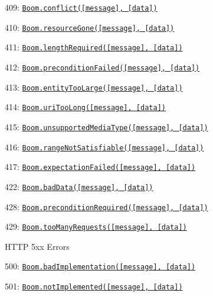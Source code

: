 \begin{DoxyItemize}
\begin{DoxyItemize}
\item 409\+: \href{#boomconflictmessage-data}{\tt {\ttfamily Boom.\+conflict(\mbox{[}message\mbox{]}, \mbox{[}data\mbox{]})}}
\item 410\+: \href{#boomresourcegonemessage-data}{\tt {\ttfamily Boom.\+resource\+Gone(\mbox{[}message\mbox{]}, \mbox{[}data\mbox{]})}}
\item 411\+: \href{#boomlengthrequiredmessage-data}{\tt {\ttfamily Boom.\+length\+Required(\mbox{[}message\mbox{]}, \mbox{[}data\mbox{]})}}
\item 412\+: \href{#boompreconditionfailedmessage-data}{\tt {\ttfamily Boom.\+precondition\+Failed(\mbox{[}message\mbox{]}, \mbox{[}data\mbox{]})}}
\item 413\+: \href{#boomentitytoolargemessage-data}{\tt {\ttfamily Boom.\+entity\+Too\+Large(\mbox{[}message\mbox{]}, \mbox{[}data\mbox{]})}}
\item 414\+: \href{#boomuritoolongmessage-data}{\tt {\ttfamily Boom.\+uri\+Too\+Long(\mbox{[}message\mbox{]}, \mbox{[}data\mbox{]})}}
\item 415\+: \href{#boomunsupportedmediatypemessage-data}{\tt {\ttfamily Boom.\+unsupported\+Media\+Type(\mbox{[}message\mbox{]}, \mbox{[}data\mbox{]})}}
\item 416\+: \href{#boomrangenotsatisfiablemessage-data}{\tt {\ttfamily Boom.\+range\+Not\+Satisfiable(\mbox{[}message\mbox{]}, \mbox{[}data\mbox{]})}}
\item 417\+: \href{#boomexpectationfailedmessage-data}{\tt {\ttfamily Boom.\+expectation\+Failed(\mbox{[}message\mbox{]}, \mbox{[}data\mbox{]})}}
\item 422\+: \href{#boombaddatamessage-data}{\tt {\ttfamily Boom.\+bad\+Data(\mbox{[}message\mbox{]}, \mbox{[}data\mbox{]})}}
\item 428\+: \href{#boompreconditionrequiredmessage-data}{\tt {\ttfamily Boom.\+precondition\+Required(\mbox{[}message\mbox{]}, \mbox{[}data\mbox{]})}}
\item 429\+: \href{#boomtoomanyrequestsmessage-data}{\tt {\ttfamily Boom.\+too\+Many\+Requests(\mbox{[}message\mbox{]}, \mbox{[}data\mbox{]})}}
\end{DoxyItemize}
\item H\+T\+TP 5xx Errors
\begin{DoxyItemize}
\item 500\+: \href{#boombadimplementationmessage-data}{\tt {\ttfamily Boom.\+bad\+Implementation(\mbox{[}message\mbox{]}, \mbox{[}data\mbox{]})}}
\item 501\+: \href{#boomnotimplementedmessage-data}{\tt {\ttfamily Boom.\+not\+Implemented(\mbox{[}message\mbox{]}, \mbox{[}data\mbox{]})}}

\end{DoxyItemize}
\end{DoxyItemize}
